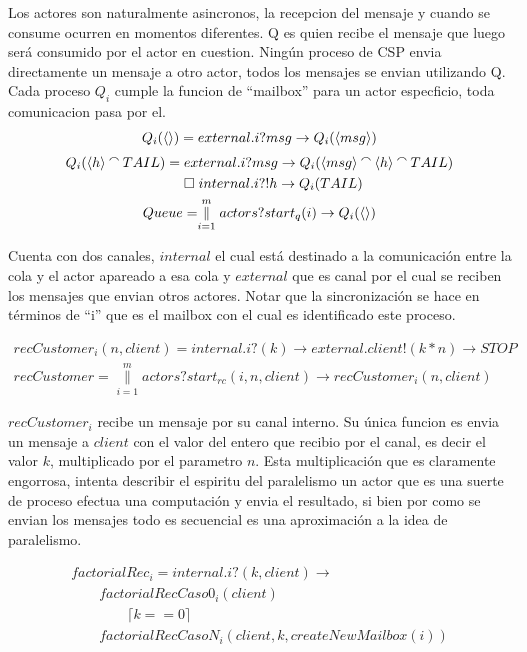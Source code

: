 \documentclass[fleqn]{article}
\newcommand{\myList}[1]{\langle #1 \rangle}
\newcommand{\myCons}[0]{\mathbin{\raise 0.8ex\hbox{$\smallfrown$}}}
\newcommand{\paralleln}[2]{\overset{#2}{\underset{i = #1}{\parallel}}}
\begin{document}
Los actores son naturalmente asincronos, la recepcion del mensaje y cuando se consume ocurren en momentos diferentes. Q es quien recibe el mensaje que luego será consumido por el actor en cuestion. Ningún proceso de CSP envia directamente un mensaje a otro actor, todos los mensajes se envian utilizando Q. Cada proceso $Q_i$ cumple la funcion de ``mailbox'' para un actor especficio, toda comunicacion pasa por el. \\

\begin{gather*}
Q_i(\myList{}) = external.i?msg \rightarrow Q_i(\myList{msg}) \\
Q_i(\myList{h} \myCons TAIL) = external.i?msg \rightarrow Q_i(\myList{msg} \myCons \myList{h} \myCons TAIL) \\ 
\qquad \square \; internal.i?!h \rightarrow Q_i(TAIL) \\  
Queue = \paralleln{1}{m} actors?start_q(i) \rightarrow Q_i(\myList{})
\end{gather*}

Cuenta con dos canales, $internal$ el cual está destinado a la comunicación entre la cola y el actor apareado a esa cola y $external$ que es canal por el cual se reciben los mensajes que envian otros actores. Notar que la sincronización se hace en términos de ``i'' que es el mailbox con el cual es identificado este proceso.

\begin{gather*}
recCustomer_i(n, client) = internal.i?(k) \rightarrow external.client!(k*n) \rightarrow STOP \\
recCustomer = \paralleln{1}{m} actors?start_{rc}(i, n, client) \rightarrow recCustomer_i(n, client)
\end{gather*}

$recCustomer_i$ recibe un mensaje por su canal interno. Su única funcion es envia un mensaje a $client$ con el valor del entero que recibio por el canal, es decir el valor $k$, multiplicado por el parametro $n$. Esta multiplicación que es claramente engorrosa, intenta describir el espiritu del paralelismo un actor que es una suerte de proceso efectua una computación y envia el resultado, si bien por como se envian los mensajes todo es secuencial es una aproximación a la idea de paralelismo.

\begin{gather*}
factorialRec_i = internal.i?(k,client) \rightarrow \\
\qquad factorialRecCaso0_i(client) \\
\qquad \qquad \lceil k == 0 \rceil \\
\qquad factorialRecCasoN_i(client, k, createNewMailbox(i))
\end{gather*}
\end{document}
